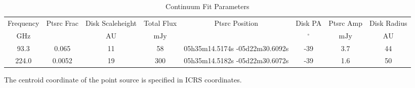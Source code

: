 \begin{table*}[htp]
\centering
\caption{Continuum Fit Parameters}
\begin{tabular}{cccccccc}
\label{tab:continuum_fit_parameters}
Frequency & Ptsrc Frac & Disk Scaleheight & Total Flux & Ptsrc Position & Disk PA & Ptsrc Amp & Disk Radius \\
$\mathrm{GHz}$ & $\mathrm{}$ & $\mathrm{AU}$ & $\mathrm{mJy}$ &  & $\mathrm{{}^{\circ}}$ & $\mathrm{mJy}$ & $\mathrm{AU}$ \\
\hline
93.3 & 0.065 & 11 & 58 & 05h35m14.5174s -05d22m30.6092s & -39 & 3.7 & 44 \\
224.0 & 0.0052 & 19 & 300 & 05h35m14.5182s -05d22m30.6072s & -39 & 1.6 & 50 \\
\hline
\end{tabular}

\par The centroid coordinate of the point source is specified in ICRS coordinates.
\end{table*}
